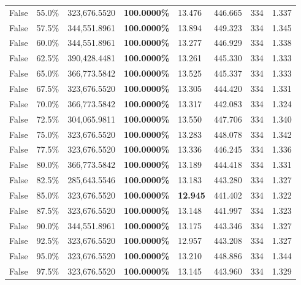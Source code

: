 \begin{table}[H]
\begin{tabular}{lllrllll}
\cline{1-8}
False & 55.0\% & 323,676.5520 & \bfseries \color{red} 100.0000\% & 13.476 & 446.665 & 334 & 1.337 \\
\cline{1-8}
False & 57.5\% & 344,551.8961 & \bfseries \color{red} 100.0000\% & 13.894 & 449.323 & 334 & 1.345 \\
\cline{1-8}
False & 60.0\% & 344,551.8961 & \bfseries \color{red} 100.0000\% & 13.277 & 446.929 & 334 & 1.338 \\
\cline{1-8}
False & 62.5\% & 390,428.4481 & \bfseries \color{red} 100.0000\% & 13.261 & 445.330 & 334 & 1.333 \\
\cline{1-8}
False & 65.0\% & 366,773.5842 & \bfseries \color{red} 100.0000\% & 13.525 & 445.337 & 334 & 1.333 \\
\cline{1-8}
False & 67.5\% & 323,676.5520 & \bfseries \color{red} 100.0000\% & 13.305 & 444.420 & 334 & 1.331 \\
\cline{1-8}
False & 70.0\% & 366,773.5842 & \bfseries \color{red} 100.0000\% & 13.317 & 442.083 & 334 & 1.324 \\
\cline{1-8}
False & 72.5\% & 304,065.9811 & \bfseries \color{red} 100.0000\% & 13.550 & 447.706 & 334 & 1.340 \\
\cline{1-8}
False & 75.0\% & 323,676.5520 & \bfseries \color{red} 100.0000\% & 13.283 & 448.078 & 334 & 1.342 \\
\cline{1-8}
False & 77.5\% & 323,676.5520 & \bfseries \color{red} 100.0000\% & 13.336 & 446.245 & 334 & 1.336 \\
\cline{1-8}
False & 80.0\% & 366,773.5842 & \bfseries \color{red} 100.0000\% & 13.189 & 444.418 & 334 & 1.331 \\
\cline{1-8}
False & 82.5\% & \color{red} 285,643.5546 & \bfseries \color{red} 100.0000\% & 13.183 & 443.280 & 334 & 1.327 \\
\cline{1-8}
False & 85.0\% & 323,676.5520 & \bfseries \color{red} 100.0000\% & \bfseries \color{red} 12.945 & 441.402 & 334 & 1.322 \\
\cline{1-8}
False & 87.5\% & 323,676.5520 & \bfseries \color{red} 100.0000\% & 13.148 & 441.997 & 334 & 1.323 \\
\cline{1-8}
False & 90.0\% & 344,551.8961 & \bfseries \color{red} 100.0000\% & 13.175 & 443.346 & 334 & 1.327 \\
\cline{1-8}
False & 92.5\% & 323,676.5520 & \bfseries \color{red} 100.0000\% & 12.957 & 443.208 & 334 & 1.327 \\
\cline{1-8}
False & 95.0\% & 323,676.5520 & \bfseries \color{red} 100.0000\% & 13.210 & 448.886 & 334 & 1.344 \\
\cline{1-8}
False & 97.5\% & 323,676.5520 & \bfseries \color{red} 100.0000\% & 13.145 & 443.960 & 334 & 1.329 \\
\cline{1-8}
\bottomrule
\end{tabular}
\end{table}
